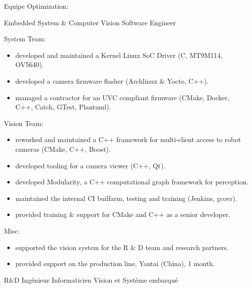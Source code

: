 \documentclass{article}
\begin{document}
\begin{llist}
{Equipe Optimization:
}

 {
Embedded System \& Computer Vision Software Engineer \\
\vspace{-0.33cm}

System Team:
\vspace{-0.33cm}
\begin{itemize}
\item developed and maintained a Kernel Linux SoC Driver (C, MT9M114, OV5640).
\item developed a camera firmware flasher (Archlinux \& Yocto, C++).
\item managed a contractor for an UVC compliant firmware (CMake, Docker, C++, Catch, GTest, Plantuml).
\end{itemize}
Vision Team:
\vspace{-0.33cm}
\begin{itemize}
\item reworked and maintained a C++ framework for multi-client access to robot cameras (CMake, C++, Boost).
\item developed tooling for a camera viewer (C++, Qt).
\item developed Modularity, a C++ computational graph framework for perception.
\item maintained the internal CI builfarm, testing and training (Jenkins,
 gcovr).
\item provided training \& support for CMake and C++ as a senior developer.
\end{itemize}
Misc:
\vspace{-0.33cm}
\begin{itemize}
\item supported the vision system for the R \& D team and research partners.
\item provided support on the production line, Yantai (China), 1 month.
\end{itemize}
}{
R\&D Ing\'{e}nieur Informaticien Vision et Syst\`{e}me embarqu\'{e}
\vspace{-0.33cm}

}
\end{llist}
\end{document}
